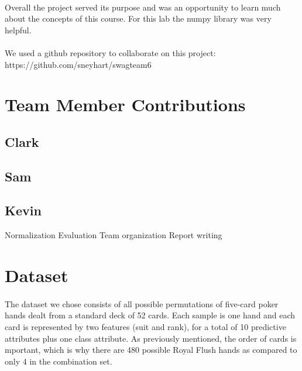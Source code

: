 \documentclass{article}
\begin{document}
\paragraph{} 
Overall the project served its purpose and was an opportunity to learn
much about the concepts of this course. For this lab the 
numpy library was very helpful.
\paragraph{} 
We used a github repository to collaborate on this project:
\newline
https://github.com/sneyhart/swagteam6
\newpage


\section*{Team Member Contributions}
\subsection*{Clark}
\subsection*{Sam}
\subsection*{Kevin}
\indent Normalization
\newline
\indent Evaluation
\newline
\indent Team organization
\newline
\indent Report writing
\newpage


\section*{Dataset}
\paragraph{}
The dataset we chose consists of all possible permutations of five-card poker hands dealt
from a standard deck of 52 cards.  Each sample is one hand and each card is represented
by two features (suit and rank), for a total of 10 predictive attributes plus one class
attribute.  As previously mentioned, the order of cards is mportant, which is why there
are 480 possible Royal Flush hands as compared to only 4 in the combination set.
\end{document}
